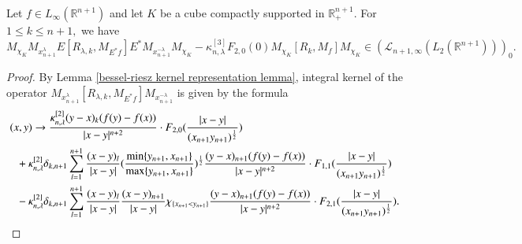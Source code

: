 \documentclass{amsart}
\begin{document}
\begin{lemma}\label{mtb main lemma} Let $f\in L_{\infty}(\mathbb{R}^{n+1})$ and let $K$ be a cube compactly supported in $\mathbb{R}^{n+1}_+.$ For $1\leq k\leq n+1,$ we have
$$M_{\chi_K}M_{x_{n+1}^{\lambda}}E[R_{\lambda,k},M_{E^{\ast}f}]E^{\ast}M_{x_{n+1}^{-\lambda}}M_{\chi_K}-\kappa^{[3]}_{n,\lambda}F_{2,0}(0)M_{\chi_K}[R_k,M_f]M_{\chi_K}\in (\mathcal{L}_{n+1,\infty}(L_2(\mathbb{R}^{n+1})))_0.$$
\end{lemma}
\begin{proof} By Lemma \ref{bessel-riesz kernel representation lemma}, integral kernel of the operator $M_{x_{n+1}^{\lambda}}[R_{\lambda,k},M_{E^{\ast}f}]M_{x_{n+1}^{-\lambda}}$ is given by the formula
\begin{align*}
(x,y)&\to\frac{\kappa^{[2]}_{n,\lambda}(y-x)_{k}(f(y)-f(x))}{|x-y|^{n+2}}\cdot F_{2,0}(\frac{|x-y|}{(x_{n+1}y_{n+1})^{\frac12}})\\
&\hspace{-0.5cm}+\kappa^{[2]}_{n,\lambda}\delta_{k,n+1}\sum_{l=1}^{n+1} \frac{(x-y)_l}{|x-y|}(\frac{\min\{y_{n+1},x_{n+1}\}}{\max\{y_{n+1},x_{n+1}\}})^{\frac12} \frac{(y-x)_{n+1}(f(y)-f(x))}{|x-y|^{n+2}}\cdot F_{1,1}(\frac{|x-y|}{(x_{n+1}y_{n+1})^{\frac12}})\\
&\hspace{-0.5cm}-\kappa^{[2]}_{n,\lambda}\delta_{k,n+1}\sum_{l=1}^{n+1} \frac{(x-y)_l}{|x-y|}\frac{(x-y)_{n+1}}{|x-y|}\chi_{\{x_{n+1}<y_{n+1}\}} \frac{(y-x)_{n+1}(f(y)-f(x))}{|x-y|^{n+2}}\cdot F_{2,1}(\frac{|x-y|}{(x_{n+1}y_{n+1})^{\frac12}}).
\end{align*}


\end{proof}
\end{document}
